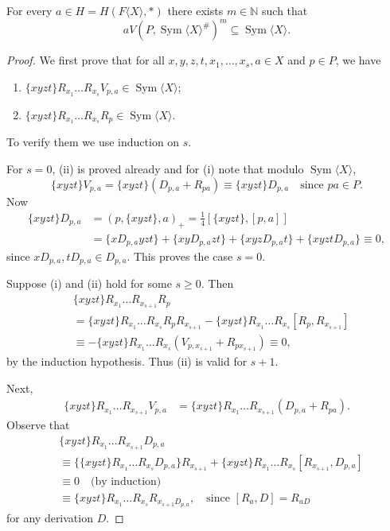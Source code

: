 \documentclass{article}
\begin{document}
\begin{lemma}
For every $a \in H = H(F\langle X \rangle,*)$ there exists $m \in \mathbb{N}$ such that
\[
a V(P, \operatorname{Sym}\langle X \rangle^{\#})^{m} \subseteq \operatorname{Sym}\langle X \rangle.
\]
\end{lemma}

\begin{proof}
We first prove that for all $x,y,z,t,x_1,\dots,x_s, a \in X$ and $p \in P$, we have
\begin{enumerate}
\item[(i)] $\{xyzt\} R_{x_1} \dots R_{x_s} V_{p,a} \in \operatorname{Sym}\langle X \rangle$;
\item[(ii)] $\{xyzt\} R_{x_1} \dots R_{x_s} R_p \in \operatorname{Sym}\langle X \rangle$.
\end{enumerate}
To verify them we use induction on $s$.

For $s=0$, (ii) is proved already and for (i) note that modulo $\operatorname{Sym}\langle X \rangle$,
\[
\{xyzt\} V_{p,a} = \{xyzt\}(D_{p,a} + R_{pa}) \equiv \{xyzt\} D_{p,a} \quad \text{since } pa \in P.
\]
Now
\begin{align*}
\{xyzt\} D_{p,a} &= (p,\{xyzt\},a)_+ = \frac{1}{4}[\{xyzt\},[p,a]] \\
&= \{x D_{p,a} y z t\} + \{x y D_{p,a} z t\} + \{x y z D_{p,a} t\} + \{x y z t D_{p,a}\} \equiv 0,
\end{align*}
since $x D_{p,a}, t D_{p,a} \in D_{p,a}$. This proves the case $s=0$.

Suppose (i) and (ii) hold for some $s \geq 0$. Then
\begin{align*}
&\{xyzt\} R_{x_1} \dots R_{x_{s+1}} R_p \\
&= \{xyzt\} R_{x_1} \dots R_{x_s} R_p R_{x_{s+1}} - \{xyzt\} R_{x_1} \dots R_{x_s} [R_p, R_{x_{s+1}}] \\
&\equiv -\{xyzt\} R_{x_1} \dots R_{x_s} (V_{p,x_{s+1}} + R_{p x_{s+1}}) \equiv 0,
\end{align*}
by the induction hypothesis. Thus (ii) is valid for $s+1$.

Next,
\begin{align*}
\{xyzt\} R_{x_1} \dots R_{x_{s+1}} V_{p,a} &= \{xyzt\} R_{x_1} \dots R_{x_{s+1}} (D_{p,a} + R_{pa}).
\end{align*}
Observe that
\begin{align*}
&\{xyzt\} R_{x_1} \dots R_{x_{s+1}} D_{p,a} \\
&\equiv \{ \{xyzt\} R_{x_1} \dots R_{x_s} D_{p,a} \} R_{x_{s+1}} + \{xyzt\} R_{x_1} \dots R_{x_s} [R_{x_{s+1}}, D_{p,a}] \\
&\equiv 0 \quad \text{(by induction)} \\
&\equiv \{xyzt\} R_{x_1} \dots R_{x_s} R_{x_{s+1} D_{p,a}}, \quad \text{since } [R_a, D] = R_{aD}
\end{align*}
for any derivation $D$.


\end{proof}
\end{document}
